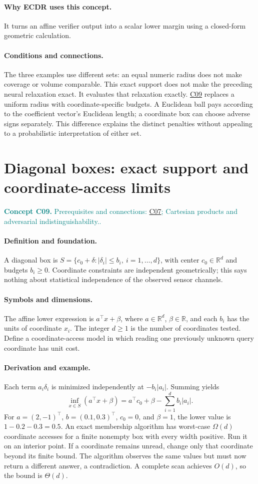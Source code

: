 \documentclass[11pt,a4paper]{article}
\newcommand{\R}{\mathbb R}
\newcommand{\abs}[1]{\left\lvert#1\right\rvert}
\newcommand{\conceptid}{Front matter}
\newcommand{\concept}[3]{\clearpage\renewcommand{\conceptid}{#1}%
\section{#2}\label{concept:#1}%
\textcolor{teal}{\textbf{Concept #1.} Prerequisites and connections: #3.}\par
\typeout{ECDR-CONCEPT-START #1 PAGE=\thepage}}
\begin{document}
\paragraph{Why ECDR uses this concept.}
It turns an affine verifier output into a scalar lower margin using a closed-form geometric calculation.
\paragraph{Conditions and connections.}
The three examples use different sets: an equal numeric radius does not make coverage or volume comparable. This exact support does not make the preceding neural relaxation exact. It evaluates that relaxation exactly. \hyperref[concept:C09]{C09} replaces a uniform radius with coordinate-specific budgets. A Euclidean ball pays according to the coefficient vector's Euclidean length; a coordinate box can choose adverse signs separately. This difference explains the distinct penalties without appealing to a probabilistic interpretation of either set.
\par\label{endconcept:C08}

\concept{C09}{Diagonal boxes: exact support and coordinate-access limits}{\hyperref[concept:C07]{C07}; Cartesian products and adversarial indistinguishability.}
\paragraph{Definition and foundation.}
A diagonal box is $S=\{c_0+\delta:\abs{\delta_i}\le b_i,\ i=1,\ldots,d\}$, with center $c_0\in\R^d$ and budgets $b_i\ge0$. Coordinate constraints are independent geometrically; this says nothing about statistical independence of the observed sensor channels.
\paragraph{Symbols and dimensions.}
The affine lower expression is $a^\top x+\beta$, where $a\in\R^d$, $\beta\in\R$, and each $b_i$ has the units of coordinate $x_i$. The integer $d\ge1$ is the number of coordinates tested. Define a coordinate-access model in which reading one previously unknown query coordinate has unit cost.
\paragraph{Derivation and example.}
Each term $a_i\delta_i$ is minimized independently at $-b_i\abs{a_i}$. Summing yields
\[
 \inf_{x\in S}(a^\top x+\beta)
 =a^\top c_0+\beta-\sum_{i=1}^d b_i\abs{a_i}.
\]
For $a=(2,-1)^\top$, $b=(0.1,0.3)^\top$, $c_0=0$, and $\beta=1$, the lower value is $1-0.2-0.3=0.5$.
An exact membership algorithm has worst-case $\Omega(d)$ coordinate accesses for a finite nonempty box with every width positive. Run it on an interior point. If a coordinate remains unread, change only that coordinate beyond its finite bound. The algorithm observes the same values but must now return a different answer, a contradiction. A complete scan achieves $O(d)$, so the bound is $\Theta(d)$.
\end{document}
